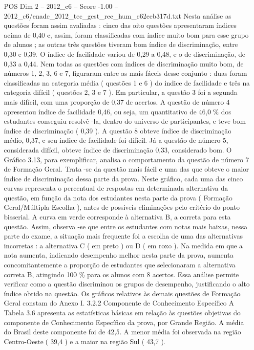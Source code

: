 \begin{textsample}{POS Dim 2 – 2012\_c6 – Score -1.00 – 2012\_c6/enade\_2012\_tec\_gest\_rec\_hum\_c62ecb317d.txt}
Nesta análise as questões foram assim avaliadas : cinco das oito questões apresentaram índices acima de 0,40 e, assim, foram classificadas com índice muito bom para esse grupo de alunos ; as outras três questões tiveram bom índice de discriminação, entre 0,30 e 0,39.
O índice de facilidade variou de 0,29 a 0,48, e o de discriminação, de 0,33 a 0,44.
Nem todas as questões com índices de discriminação muito bom, de números 1, 2, 3, 6 e 7, figuraram entre as mais fáceis desse conjunto : duas foram classificadas na categoria média ( questões 1 e 6 ) do índice de facilidade e três na categoria difícil ( questões 2, 3 e 7 ).
Em particular, a questão 3 foi a segunda mais difícil, com uma proporção de 0,37 de acertos.
A questão de número 4 apresentou índice de facilidade 0,46, ou seja, um quantitativo de 46,0 \% dos estudantes conseguiu resolvê -la, dentro do universo de participantes, e teve bom índice de discriminação ( 0,39 ).
A questão 8 obteve índice de discriminação médio, 0,37, e seu índice de facilidade foi difícil.
Já a questão de número 5, considerada difícil, obteve índice de discriminação 0,33, considerado bom.
O Gráfico 3.13, para exemplificar, analisa o comportamento da questão de número 7 de Formação Geral.
Trata -se da questão mais fácil e uma das que obteve o maior índice de discriminação dessa parte da prova.
Neste gráfico, cada uma das cinco curvas representa o percentual de respostas em determinada alternativa da questão, em função da nota dos estudantes nesta parte da prova ( Formação Geral/Múltipla Escolha ), antes de possíveis eliminações pelo critério do ponto bisserial.
A curva em verde corresponde à alternativa B, a correta para esta questão.
Assim, observa -se que entre os estudantes com notas mais baixas, nessa parte do exame, a situação mais frequente foi a escolha de uma das alternativas incorretas : a alternativa C ( em preto ) ou D ( em roxo ).
Na medida em que a nota aumenta, indicando desempenho melhor nesta parte da prova, aumenta concomitantemente a proporção de estudantes que selecionaram a alternativa correta B, atingindo 100 \% para os alunos com 8 acertos.
Essa análise permite verificar como a questão discriminou os grupos de desempenho, justificando o alto índice obtido na questão.
Os gráficos relativos às demais questões de Formação Geral constam do Anexo I. 3.2.2 Componente de Conhecimento Específico A Tabela 3.6 apresenta as estatísticas básicas em relação às questões objetivas do componente de Conhecimento Específico da prova, por Grande Região.
A média do Brasil deste componente foi de 42,5.
A menor média foi observada na região Centro-Oeste ( 39,4 ) e a maior na região Sul ( 43,7 ).

\end{textsample}
